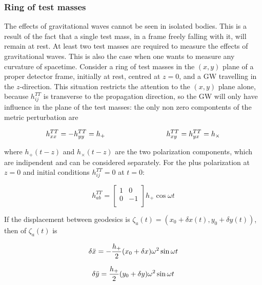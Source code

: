 \documentclass[binding=0.6cm, LaM]{sapthesis}
\begin{document}
\subsubsection{Ring of test masses}

	The effects of gravitational waves cannot be seen in isolated bodies. 
	This is a result of the fact that a single test mass, in a frame freely falling with it, 
	will remain at rest. At least two test masses are required to measure the effects of gravitational waves. 
	This is also the case when one wants to measure any curvature of spacetime.
	Consider a ring of test masses in the $(x, y)$ plane of a proper detector frame, initially at rest, centred at $z = 0$, 
	and a GW travelling in the $z$-direction.
	This situation restricts the attention to the $(x,y)$ plane alone, because $h_{ij}^{TT}$ is transverse to the propagation direction, 
	so the GW will only have influence in the plane of the test masses:
	the only non zero compontents of the metric perturbation are

		\begin{equation}
		h_{xx}^{TT} = - h_{yy}^{TT} = h_{+} \hspace*{3cm} h_{xy}^{TT} = h_{yx}^{TT} = h_{\times}
		\end{equation}

	where $h_{+}(t-z)$ and $h_{\times}(t-z)$ are the two polarization components, which are indipendent and can be considered separately.
	For the plus polarization at $z=0$ and initial conditions $h_{ij}^{TT} = 0$ at $t=0$:

		\begin{equation}
		h_{ab}^{TT} = 
		\begin{bmatrix}
		1  & 0 \\
		0 &  -1 \\
		\end{bmatrix} 
		h_{+}\cos \omega t
		\end{equation}

	If the displacement between geodesics is $\zeta_a (t) = (x_0 + \delta x(t), y_0 + \delta y(t))$, then of $\zeta_a (t)$ is

		\begin{equation}
		\delta {\ddot x} = - {{h_{+}} \over 2} (x_0 + \delta x) \omega ^2 \sin \omega t
		\end{equation}

		\begin{equation}
		\delta {\ddot y} =  {{h_{+}} \over 2} (y_0 + \delta y) \omega ^2 \sin \omega t
		\end{equation}
\end{document}

